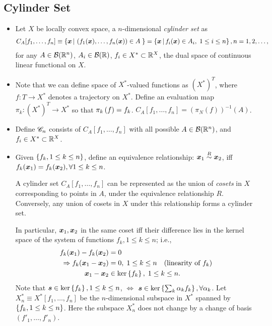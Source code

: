 \documentclass[11pt]{article}
\begin{document}
\subsection{Cylinder Set}
\begin{itemize}
\item 
\begin{definition}
Let $X$ be locally convex space, a $n$-dimensional \emph{cylinder set} as \citep{lifshits2013gaussian}
\begin{align*}
C_{A}[f_{1},\ldots, f_{n}]\equiv \left\{\boldsymbol{x}\,|\, \left(f_{1}(\boldsymbol{x}),  \ldots, f_{n}(\boldsymbol{x})\right) \in A\;  \right\} = \left\{\boldsymbol{x}\,|\, f_{i}(\boldsymbol{x}) \in A_{i},\; 1\le i \le n \right\} , n=1,2,\ldots,
\end{align*}
for any $A\in {\mathcal B}({\mathbb R}^{n})$, $A_{i}\in {\mathcal B}({\mathbb R})$, $f_{i}\in X^{*}\subset {\mathbb R}^{X}$, the dual space of continuous linear functional on $X$.
\end{definition}

\item Note that we can define space of $X^{*}$-valued functions as $(X^{*})^{T}$, where $f: T\rightarrow X^{*}$ denotes a trajectory on $X^{*}$.  Define an evaluation map $\pi_{k}: (X^{*})^{T} \rightarrow X^{*}$ so that $\pi_{k}\left(f\right) = f_{k}$. $C_{A}[f_{1},\ldots, f_{n}] = (\pi_{N}(f))^{-1}(A)$.

\item Define ${\mathscr C}_{n}$ consists of $C_{A}[f_{1},\ldots, f_{n}]$ with all possible $A\in {\mathcal B}({\mathbb R}^{n})$, and $f_{i}\in X^{*}\subset {\mathbb R}^{X}$.

\item Given $\left\{f_{k}, 1\le k\le n\right\}$, define an equivalence relationship: $\boldsymbol{x}_{1}\stackrel{R}{\sim} \boldsymbol{x}_{2}$, iff $f_{k}(\boldsymbol{x}_{1}) = f_{k}(\boldsymbol{x}_{2}), \forall 1\le k\le n$. 

A cylinder set $C_{A}[f_{1},\ldots, f_{n}]$ can be represented as the union of \emph{cosets} in $X$ corresponding to points in $A$, under the equivalence relationship $R$. Conversely, any union of cosets in $X$ under this relationship forms a cylinder set. 

In particular,  $\boldsymbol{x}_{1}, \boldsymbol{x}_{2}$ in the same coset iff their difference lies in the kernel space of the system of functions $f_{k}, 1\le k \le n$; i.e., 
\begin{align*}
f_{k}(\boldsymbol{x}_{1}) - f_{k}(\boldsymbol{x}_{2}) &=0\\
\Rightarrow f_{k}(\boldsymbol{x}_{1} - \boldsymbol{x}_{2})&=0,\; 1\le k \le n \quad (\text{linearity of } f_{k})\\
\boldsymbol{x}_{1} - \boldsymbol{x}_{2} &\in \text{ker}\left\{f_{k}\right\},\;1\le k \le n.
\end{align*}
Note that $\boldsymbol{s}\in \text{ker}\left\{f_{k}\right\}, 1\le k \le n$, $\Leftrightarrow$ $\boldsymbol{s}\in \text{ker}\left\{\sum_{k}\alpha_{k}f_{k}\right\}, \forall \alpha_{k}$. Let $X_{n}^{*}\equiv X^{*}[f_{1},\ldots, f_{n}]$ be the $n$-dimensional subspace in $X^{*}$ spanned by $\left\{f_{k}, 1\le k\le n\right\}$. Here the subspace $X^{*}_{n}$ does not change by a change of basis $(f'_{1},\ldots, f'_{n})$.


\end{itemize}
\end{document}
